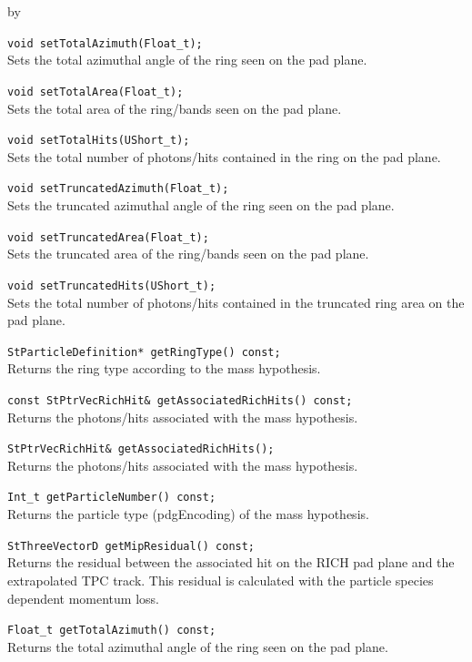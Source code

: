 \documentclass[twoside]{article}
\newcommand{\entrylabel}[1]{\mbox{\textbf{{#1}}}\hfil}%
\newenvironment{entry}
{\begin{list}{}%
    {\renewcommand{\makelabel}{\entrylabel}%
     \setlength{\labelwidth}{90pt}%
     \setlength{\leftmargin}{\labelwidth}
     \advance\leftmargin by \labelsep%
      }%
    }%
  {\end{list}}
\newcommand{\Entrylabel}[1]%
{\raisebox{0pt}[1ex][0pt]{\makebox[\labelwidth][l]%
    {\parbox[t]{\labelwidth}{\hspace{0pt}\textbf{{#1}}}}}}
\newenvironment{Entry}%
{\renewcommand{\entrylabel}{\Entrylabel}\begin{entry}}%
  {\end{entry}}
\begin{document}
\begin{Entry}
    \verb+void setTotalAzimuth(Float_t);+\\
    Sets the total azimuthal angle of the ring
    seen on the pad plane.
    
    \verb+void setTotalArea(Float_t);+\\
    Sets the total area of the ring/bands
    seen on the pad plane.

    \verb+void setTotalHits(UShort_t);+\\
    Sets the total number of photons/hits
    contained in the ring on the pad plane.
    
    \verb+void setTruncatedAzimuth(Float_t);+\\
    Sets the truncated azimuthal angle of the ring
    seen on the pad plane.

    \verb+void setTruncatedArea(Float_t);+\\
    Sets the truncated area of the ring/bands
    seen on the pad plane.

    \verb+void setTruncatedHits(UShort_t);+\\
    Sets the total number of photons/hits
    contained in the truncated ring area on
    the pad plane.

    \verb+StParticleDefinition* getRingType() const;+\\
    Returns the ring type according to the mass hypothesis.

    \verb+const StPtrVecRichHit& getAssociatedRichHits() const;+\\
    Returns the photons/hits associated with the
    mass hypothesis.
    
    \verb+StPtrVecRichHit& getAssociatedRichHits();+\\
    Returns the photons/hits associated with the
    mass hypothesis.
    
    \verb+Int_t getParticleNumber() const;+\\
    Returns the particle type (pdgEncoding)
    of the mass hypothesis.
    
    \verb+StThreeVectorD getMipResidual() const;+\\
    Returns  the residual between the associated hit on the
    RICH pad plane and the extrapolated TPC track.  This
    residual is calculated with the particle species dependent
    momentum loss.
    
    \verb+Float_t getTotalAzimuth() const;+\\
    Returns the total azimuthal angle of the ring
    seen on the pad plane.
    

\end{Entry}
\end{document}
